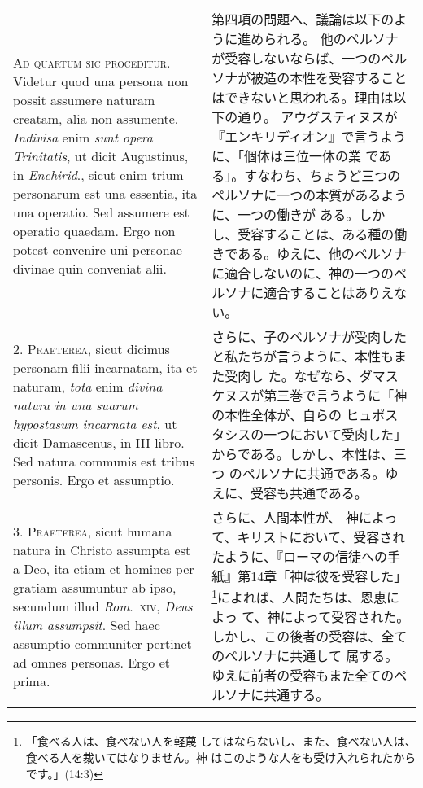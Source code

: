 \documentclass[10pt]{jsarticle} %
\begin{document}
\begin{longtable}{p{21em}p{21em}}

{\Huge A}{\scshape d quartum sic proceditur}. Videtur quod una persona non possit assumere
naturam creatam, alia non assumente. {\itshape Indivisa} enim {\itshape sunt opera
Trinitatis}, ut dicit Augustinus, in {\itshape Enchirid}., sicut enim trium
personarum est una essentia, ita una operatio. Sed assumere est operatio
quaedam. Ergo non potest convenire uni personae divinae quin conveniat
alii.


&

第四項の問題へ、議論は以下のように進められる。
他のペルソナが受容しないならば、一つのペルソナが被造の本性を受容すること
 はできないと思われる。理由は以下の通り。
アウグスティヌスが『エンキリディオン』で言うように、「個体は三位一体の業
 である」。すなわち、ちょうど三つのペルソナに一つの本質があるように、一つの働きが
 ある。しかし、受容することは、ある種の働きである。ゆえに、他のペルソナ
 に適合しないのに、神の一つのペルソナに適合することはありえない。

\\



2. {\scshape Praeterea}, sicut dicimus personam filii incarnatam, ita et naturam, {\itshape tota}
enim {\itshape divina natura in una suarum hypostasum incarnata est}, ut dicit
Damascenus, in III libro. Sed natura communis est tribus personis. Ergo
et assumptio.


&

さらに、子のペルソナが受肉したと私たちが言うように、本性もまた受肉し
 た。なぜなら、ダマスケヌスが第三巻で言うように「神の本性全体が、自らの
 ヒュポスタシスの一つにおいて受肉した」からである。しかし、本性は、三つ
 のペルソナに共通である。ゆえに、受容も共通である。


\\



3. {\scshape Praeterea}, sicut humana natura in Christo assumpta est a Deo, ita etiam
et homines per gratiam assumuntur ab ipso, secundum illud {\itshape Rom}.~{\scshape xiv}, {\itshape Deus
illum assumpsit}. Sed haec assumptio communiter pertinet ad omnes
personas. Ergo et prima.


&

さらに、人間本性が、
 神によって、キリストにおいて、受容されたように、『ローマの信徒への手
 紙』第14章「神は彼を受容した」\footnote{「食べる人は、食べない人を軽蔑
 してはならないし、また、食べない人は、食べる人を裁いてはなりません。神
 はこのような人をも受け入れられたからです。」(14:3)}によれば、人間たちは、恩恵によっ
 て、神によって受容された。しかし、この後者の受容は、全てのペルソナに共通して
 属する。ゆえに前者の受容もまた全てのペルソナに共通する。


\end{longtable}
\end{document}
